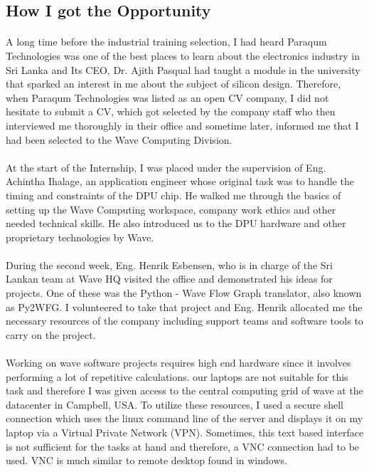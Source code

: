 
\subsection{How I got the Opportunity}

\paragraph{}
A long time before the industrial training selection, I had heard Paraqum Technologies was one of the best places to learn about the electronics industry in Sri Lanka and Its CEO, Dr. Ajith Pasqual had taught a module in the university that sparked an interest in me about the subject of silicon design. Therefore, when Paraqum Technologies was listed as an open CV company, I did not hesitate to submit a CV, which got selected by the company staff who then interviewed me thoroughly in their office and sometime later, informed me that I had been selected to the Wave Computing Division.

\paragraph{}
At the start of the Internship, I was placed under the supervision of Eng. Achintha Ihalage, an application engineer whose original task was to handle the timing and constraints of the DPU chip. He walked me through the basics of setting up the Wave Computing workspace, company work ethics and other needed technical skills. He also introduced us to the DPU hardware and other proprietary technologies by Wave. 

\paragraph{}
During the second week, Eng. Henrik Esbensen, who is in charge of the Sri Lankan team at Wave HQ visited the office and demonstrated his ideas for projects. One of these was the Python - Wave Flow Graph translator, also known as Py2WFG. I volunteered to take that project and Eng. Henrik allocated me the necessary resources of the company including support teams and software tools to carry on the project.

\paragraph{}
Working on wave software projects requires high end hardware since it involves performing a lot of repetitive calculations. our laptops are not suitable for this task and therefore I was given access to the central computing grid of wave at the datacenter in Campbell, USA. To utilize these resources, I used a secure shell connection which uses the linux command line of the server and displays it on my laptop via a Virtual Private Network (VPN). Sometimes, this text based interface is not sufficient for the tasks at hand and therefore, a VNC connection had to be used. VNC is much similar to remote desktop found in windows.

